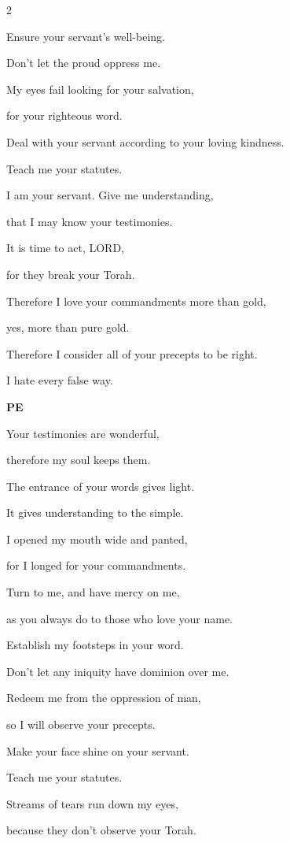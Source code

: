 \begin{multicols}{2}
	
	\myverse{}Ensure your servant’s well-being.
	
	Don’t let the proud oppress me.
	
	
	\myverse{}My eyes fail looking for your salvation,
	
	for your righteous word.
	
	
	\myverse{}Deal with your servant according to your loving kindness.
	
	Teach me your statutes.
	
	
	\myverse{}I am your servant. Give me understanding,
	
	that I may know your testimonies.
	
	
	\myverse{}It is time to act, LORD,
	
	for they break your Torah.
	
	
	\myverse{}Therefore I love your commandments more than gold,
	
	yes, more than pure gold.
	
	
	\myverse{}Therefore I consider all of your precepts to be right.
	
	I hate every false way.
	
	\vspace{\baselineskip}
	\textbf{PE}
	
	
	\myverse{}Your testimonies are wonderful,
	
	therefore my soul keeps them.
	
	
	\myverse{}The entrance of your words gives light.
	
	It gives understanding to the simple.
	
	
	\myverse{}I opened my mouth wide and panted,
	
	for I longed for your commandments.
	
	
	\myverse{}Turn to me, and have mercy on me,
	
	as you always do to those who love your name.
	
	
	\myverse{}Establish my footsteps in your word.
	
	Don’t let any iniquity have dominion over me.
	
	
	\myverse{}Redeem me from the oppression of man,
	
	so I will observe your precepts.
	
	
	\myverse{}Make your face shine on your servant.
	
	Teach me your statutes.
	
	
	\myverse{}Streams of tears run down my eyes,
	
	because they don’t observe your Torah.
	

\end{multicols}
